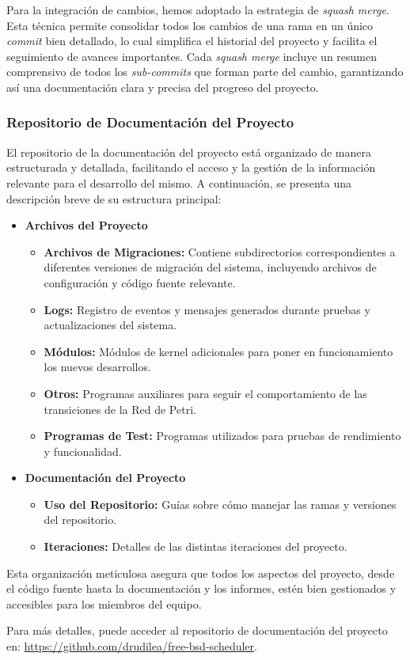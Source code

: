 Para la integración de cambios, hemos adoptado la estrategia de \textit{squash merge}. Esta técnica permite consolidar todos los cambios de una rama en un único \textit{commit} bien detallado, lo cual simplifica el historial del proyecto y facilita el seguimiento de avances importantes. Cada \textit{squash merge} incluye un resumen comprensivo de todos los \textit{sub-commits} que forman parte del cambio, garantizando así una documentación clara y precisa del progreso del proyecto.

\subsubsection{Repositorio de Documentación del Proyecto} \label{sect:wiki}

El repositorio de la documentación del proyecto está organizado de manera estructurada y detallada, facilitando el acceso y la gestión de la información relevante para el desarrollo del mismo. A continuación, se presenta una descripción breve de su estructura principal:

\begin{itemize}
    \item \textbf{Archivos del Proyecto}
    \begin{itemize}
        \item \textbf{Archivos de Migraciones:} Contiene subdirectorios correspondientes a diferentes versiones de migración del sistema, incluyendo archivos de configuración y código fuente relevante.
        \item \textbf{Logs:} Registro de eventos y mensajes generados durante pruebas y actualizaciones del sistema.
        \item \textbf{Módulos:} Módulos de kernel adicionales para poner en funcionamiento los nuevos desarrollos.
        \item \textbf{Otros:} Programas auxiliares para seguir el comportamiento de las transiciones de la Red de Petri.
        \item \textbf{Programas de Test:} Programas utilizados para pruebas de rendimiento y funcionalidad.
    \end{itemize}
    \item \textbf{Documentación del Proyecto}
    \begin{itemize}
        \item \textbf{Uso del Repositorio:} Guías sobre cómo manejar las ramas y versiones del repositorio.
        \item \textbf{Iteraciones:} Detalles de las distintas iteraciones del proyecto.
    \end{itemize}
\end{itemize}

Esta organización meticulosa asegura que todos los aspectos del proyecto, desde el código fuente hasta la documentación y los informes, estén bien gestionados y accesibles para los miembros del equipo.

Para más detalles, puede acceder al repositorio de documentación del proyecto en: \url{https://github.com/drudilea/free-bsd-scheduler}.
